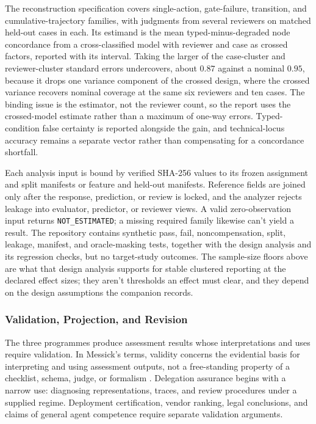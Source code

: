The reconstruction specification covers single-action, gate-failure, transition, and cumulative-trajectory families, with judgments from several reviewers on matched held-out cases in each. Its estimand is the mean typed-minus-degraded node concordance from a cross-classified model with reviewer and case as crossed factors, reported with its interval. Taking the larger of the case-cluster and reviewer-cluster standard errors undercovers, about \(0.87\) against a nominal \(0.95\), because it drops one variance component of the crossed design, where the crossed variance recovers nominal coverage at the same six reviewers and ten cases. The binding issue is the estimator, not the reviewer count, so the report uses the crossed-model estimate rather than a maximum of one-way errors. Typed-condition false certainty is reported alongside the gain, and technical-locus accuracy remains a separate vector rather than compensating for a concordance shortfall.

Each analysis input is bound by verified SHA-256 values to its frozen assignment and split manifests or feature and held-out manifests. Reference fields are joined only after the response, prediction, or review is locked, and the analyzer rejects leakage into evaluator, predictor, or reviewer views. A valid zero-observation input returns \texttt{NOT\_ESTIMATED}; a missing required family likewise can't yield a result. The repository contains synthetic pass, fail, noncompensation, split, leakage, manifest, and oracle-masking tests, together with the design analysis and its regression checks, but no target-study outcomes. The sample-size floors above are what that design analysis supports for stable clustered reporting at the declared effect sizes; they aren't thresholds an effect must clear, and they depend on the design assumptions the companion records.

\subsubsection{Validation, Projection, and Revision}

The three programmes produce assessment results whose interpretations and uses require validation. In Messick's terms, validity concerns the evidential basis for interpreting and using assessment outputs, not a free-standing property of a checklist, schema, judge, or formalism \citep{messick1995Validity}. Delegation assurance begins with a narrow use: diagnosing representations, traces, and review procedures under a supplied regime. Deployment certification, vendor ranking, legal conclusions, and claims of general agent competence require separate validation arguments.

